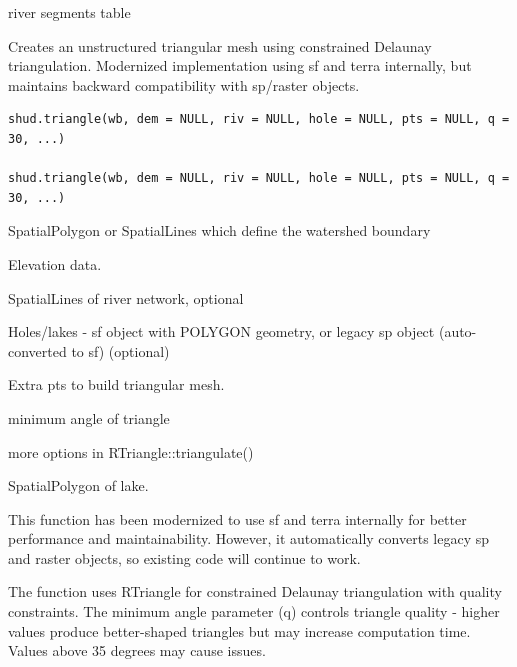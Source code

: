 \documentclass[a4paper]{book}
\begin{document}
%
\begin{Value}
river segments table
\end{Value}
%
\begin{Description}\relax
Creates an unstructured triangular mesh using constrained Delaunay
triangulation. Modernized implementation using sf and terra internally,
but maintains backward compatibility with sp/raster objects.
\end{Description}
%
\begin{Usage}
\begin{verbatim}
shud.triangle(wb, dem = NULL, riv = NULL, hole = NULL, pts = NULL, q = 30, ...)

shud.triangle(wb, dem = NULL, riv = NULL, hole = NULL, pts = NULL, q = 30, ...)
\end{verbatim}
\end{Usage}
%
\begin{Arguments}
\begin{ldescription}
\item[\code{wb}] SpatialPolygon or SpatialLines which define the watershed boundary

\item[\code{dem}] Elevation data.

\item[\code{riv}] SpatialLines of river network, optional

\item[\code{hole}] Holes/lakes - sf object with POLYGON geometry, or legacy
sp object (auto-converted to sf) (optional)

\item[\code{pts}] Extra pts to build triangular mesh.

\item[\code{q}] minimum angle of triangle

\item[\code{...}] more options in RTriangle::triangulate()

\item[\code{lake}] SpatialPolygon of lake.
\end{ldescription}
\end{Arguments}
%
\begin{Details}\relax
This function has been modernized to use sf and terra internally for
better performance and maintainability. However, it automatically converts
legacy sp and raster objects, so existing code will continue to work.

The function uses RTriangle for constrained Delaunay triangulation with
quality constraints. The minimum angle parameter (q) controls triangle
quality - higher values produce better-shaped triangles but may increase
computation time. Values above 35 degrees may cause issues.
\end{Details}
\end{document}
